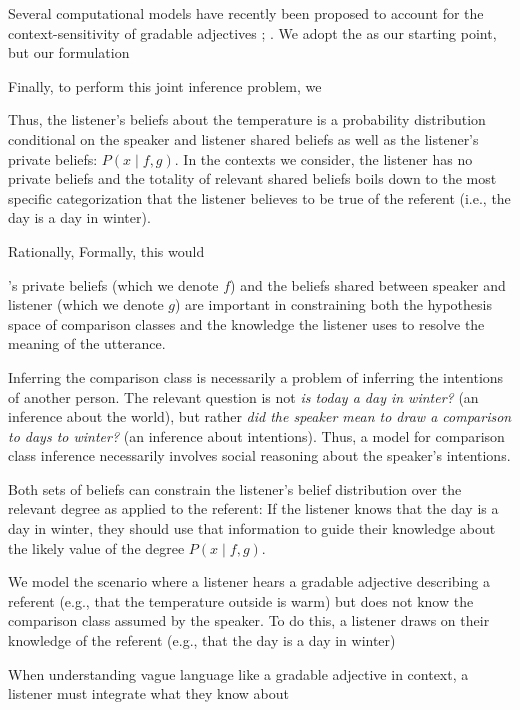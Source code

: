 \documentclass[doc]{apa6}
\begin{document}
Several computational models have recently been proposed to account for the context-sensitivity of gradable adjectives ; .
We adopt the  as our starting point, but our formulation 


Finally, to perform this joint inference problem, we 

Thus, the listener's beliefs about the temperature is a probability distribution conditional on the speaker and listener shared beliefs as well as the listener's private beliefs: $P(x \mid f, g)$.
In the contexts we consider, the listener has no private beliefs and the totality of relevant shared beliefs boils down to the most specific categorization that the listener believes to be true of the referent (i.e., the day is a day in winter).






Rationally, 
Formally, this would 


's private beliefs (which we denote $f$) and the beliefs shared between speaker and listener (which we denote $g$) are important in constraining both the hypothesis space of comparison classes and the knowledge the listener uses to resolve the meaning of the utterance.

Inferring the comparison class is necessarily a problem of inferring the intentions of another person.
The relevant question is not \emph{is today a day in winter?} (an inference about the world), but rather \emph{did the speaker mean to draw a comparison to days to winter?} (an inference about intentions).
Thus, a model for comparison class inference necessarily involves social reasoning about the speaker's intentions.


Both sets of beliefs can constrain the listener's belief distribution over the relevant degree as applied to the referent: If the listener knows that the day is a day in winter, they should use that information to guide their knowledge about the likely value of the degree $P(x \mid f, g)$.


We model the scenario where a listener hears a gradable adjective describing a referent (e.g., that the temperature outside is warm) but does not know the comparison class assumed by the speaker. 
To do this, a listener draws on their knowledge of the referent (e.g., that the day is a day in winter)

When understanding vague language like a gradable adjective in context, a listener must integrate what they know about 
\end{document}
